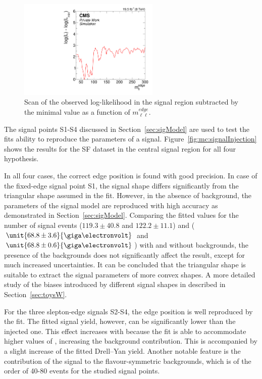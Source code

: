 \begin{figure}[htbp]
\centering
  \includegraphics[width=0.6\textwidth]{plots/results/fit/mcFits/MC.pdf}
\caption{Scan of the observed log-likelihood in the signal region subtracted by the minimal value as a function of $m_{\ell\ell}^{edge}$.}
\label{fig:mc:bgOnlyProfile}
\end{figure}

The signal points S1-S4 discussed in Section~\ref{sec:sigModel} are used to test the fits ability to reproduce the parameters of a signal. Figure~\ref{fig:mc:signalInjection} shows the results for the SF dataset in the central signal region for all four hypothesis. 

In all four cases, the correct edge position is found with good precision. In case of the fixed-edge signal point S1, the signal shape differs significantly from the triangular shape assumed in the fit. However, in the absence of background, the parameters of the signal model are reproduced with high accuracy as demonstrated in Section~\ref{sec:sigModel}. Comparing the fitted values for the number of signal events ($119.3\pm40.8$ and $122.2\pm11.1$) and \mlledge ($\unit{68.8\pm3.6}{\giga\electronvolt}$ and $\unit{68.8\pm0.6}{\giga\electronvolt}$) with and without backgrounds, the presence of the backgrounds does not significantly affect the result, except for much increased uncertainties. It can be concluded that the triangular shape is suitable to extract the signal parameters of more convex shapes. A more detailed study of the biases introduced by different signal shapes in described in Section~\ref{sec:toysW}. 

For the three slepton-edge signals S2-S4, the edge position is well reproduced by the fit. The fitted signal yield, however, can be significantly lower than the injected one. This effect increases with \mlledge because the fit is able to accommodate higher values of \Rsfof, increasing the background contribution. This is accompanied by a slight increase of the fitted Drell--Yan yield. Another notable feature is the contribution of the signal to the flavour-symmetric backgrounds, which is of the order of 40-80 events for the studied signal points.

